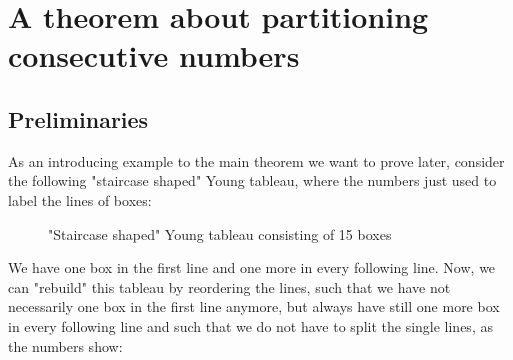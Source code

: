 
\chapter{A theorem about partitioning consecutive numbers} %

\label{Chapter4} %

\section{Preliminaries}
As an introducing example to the main theorem we want to prove later, consider the following "staircase shaped" Young tableau, where the numbers just used to label the lines of boxes:
\begin{figure}[ht]
\centering
{}
  \caption{"Staircase shaped" Young tableau consisting of 15 boxes}
  \label{figure4:Figure 4}
\end{figure}

We have one box in the first line and one more in every following line. Now, we can "rebuild" this tableau by reordering the lines, such that we have not necessarily one box in the first line anymore, but always have still one more box in every following line and such that we do not have to split the single lines, as the numbers show:

